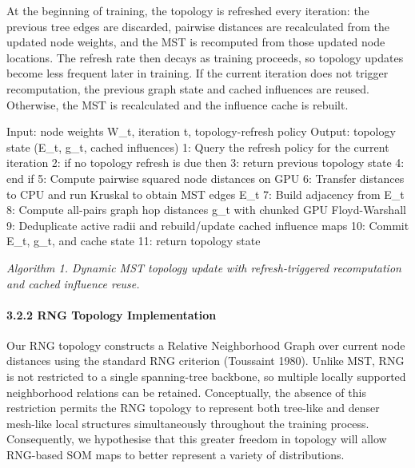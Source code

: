 \documentclass[
]{article}
\newenvironment{Shaded}{}{}
\newcommand{\NormalTok}[1]{#1}
\begin{document}
At the beginning of training, the topology is refreshed every iteration:
the previous tree edges are discarded, pairwise distances are
recalculated from the updated node weights, and the MST is recomputed
from those updated node locations. The refresh rate then decays as
training proceeds, so topology updates become less frequent later in
training. If the current iteration does not trigger recomputation, the
previous graph state and cached influences are reused. Otherwise, the
MST is recalculated and the influence cache is rebuilt.

\begin{Shaded}
\begin{Highlighting}[]
\NormalTok{Input: node weights W\_t, iteration t, topology{-}refresh policy}
\NormalTok{Output: topology state (E\_t, g\_t, cached influences)}
\NormalTok{ 1: Query the refresh policy for the current iteration}
\NormalTok{ 2: if no topology refresh is due then}
\NormalTok{ 3:         return previous topology state}
\NormalTok{ 4: end if}
\NormalTok{ 5: Compute pairwise squared node distances on GPU}
\NormalTok{ 6: Transfer distances to CPU and run Kruskal to obtain MST edges E\_t}
\NormalTok{ 7: Build adjacency from E\_t}
\NormalTok{ 8: Compute all{-}pairs graph hop distances g\_t with chunked GPU Floyd{-}Warshall}
\NormalTok{ 9: Deduplicate active radii and rebuild/update cached influence maps}
\NormalTok{10: Commit E\_t, g\_t, and cache state}
\NormalTok{11: return topology state}
\end{Highlighting}
\end{Shaded}

\emph{Algorithm 1. Dynamic MST topology update with refresh-triggered
recomputation and cached influence reuse.}

\paragraph{3.2.2 RNG Topology
Implementation}\label{rng-topology-implementation}

Our RNG topology constructs a Relative Neighborhood Graph over current
node distances using the standard RNG criterion (Toussaint 1980). Unlike
MST, RNG is not restricted to a single spanning-tree backbone, so
multiple locally supported neighborhood relations can be retained.
Conceptually, the absence of this restriction permits the RNG topology
to represent both tree-like and denser mesh-like local structures
simultaneously throughout the training process. Consequently, we
hypothesise that this greater freedom in topology will allow RNG-based
SOM maps to better represent a variety of distributions.
\end{document}
